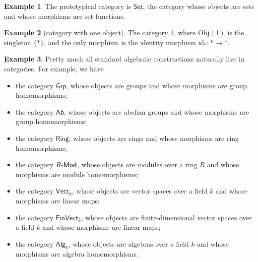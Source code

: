 \documentclass[a4paper,10pt]{scrreprt}
\newcommand{\Obj}{\mathrm{Obj}}
\def\mhyp{{\hbox{-}}}
\theoremstyle{definition}
\newtheorem{example}{Example}[section]
\theoremstyle{plain}
\theoremstyle{remark}
\begin{document}
\begin{example}
  The prototypical category is $\mathsf{Set}$, the category whose objects are sets and whose morphisms are set functions.  
\end{example}


\begin{example}[category with one object]
  \label{eg:categorywithoneobject}
  The category $\mathsf{1}$, where $\Obj(\mathsf{1})$ is the singleton $\{*\}$, and the only morphism is the identity morphism $\mathrm{id}_{*}\colon * \to *$.
\end{example}
\begin{example}
  \label{eg:examplesofcategories}
  Pretty much all standard algebraic constructions naturally live in categories. For example, we have 
  \begin{itemize} 
    \item the category $\mathsf{Grp}$, whose objects are groups and whose morphisms are group homomorphisms;

    \item \label{item:categoryab} the category $\mathsf{Ab}$, whose objects are abelian groups and whose morphisms are group homomorphisms;

    \item the category $\mathsf{Ring}$, whose objects are rings and whose morphisms are ring homomorphisms;

    \item the category $R\mhyp\mathsf{Mod}$, whose objects are modules over a ring $R$ and whose morphisms are module homomorphisms;

    \item the category $\mathsf{Vect}_{k}$, whose objects are vector spaces over a field $k$ and whose morphisms are linear maps;
    \item the category $\mathsf{FinVect}_{k}$, whose objects are finite-dimensional vector spaces over a field $k$ and whose morphisms are linear maps;
    \item the category $\mathsf{Alg}_{k}$, whose objects are algebras over a field $k$ and whose morphisms are algebra homomorphisms.
  \end{itemize}
\end{example}
\end{document}
